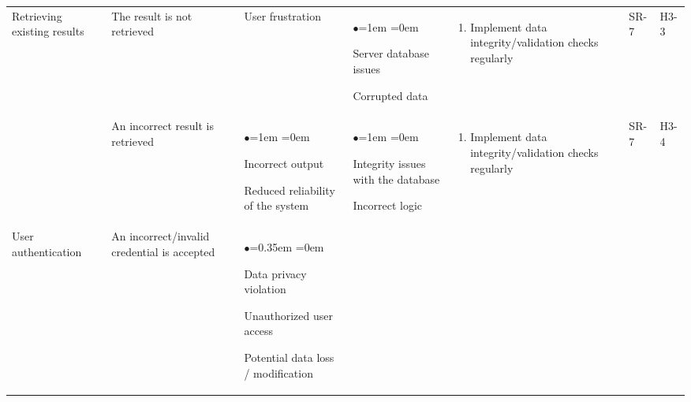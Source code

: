 \documentclass{article}
\begin{document}
\begin{table}[H]
    \centering
    \begin{tabularx}{\textwidth}{|P{2cm}|P{2cm}|P{2cm}|P{2cm}|P{3.45cm}|P{1cm}|P{1cm}|}
        \hline
        Retrieving existing results & The result is not retrieved & User frustration & 
        \begin{list}{$\bullet$}{\leftmargin=1em \itemindent=0em}
            \item Server database issues
            \item Corrupted data
        \end{list}
        & 
        \begin{enumerate}[label=(\alph*)]{\leftmargin=1em \itemindent=0em}
            \item Implement data integrity/validation checks regularly
        \end{enumerate}
        & SR-7 & H3-3\\
        & An incorrect result is retrieved & 
         \begin{list}{$\bullet$}{\leftmargin=1em \itemindent=0em}
            \item Incorrect output
            \item Reduced reliability of the system
        \end{list}
        & 
        \begin{list}{$\bullet$}{\leftmargin=1em \itemindent=0em}
            \item Integrity issues with the database
            \item Incorrect logic
        \end{list}
        & 
        \begin{enumerate}[label=(\alph*)]{\leftmargin=1em \itemindent=0em}
            \item Implement data integrity/validation checks regularly
        \end{enumerate}
        & SR-7 & H3-4\\
        \hline
        User authentication & An incorrect/invalid credential is accepted & 
        \begin{list}{$\bullet$}{\leftmargin=0.35em \itemindent=0em}
            \item Data privacy violation
            \item Unauthorized user access
            \item Potential data loss / modification
        \end{list}

\end{tabularx}
\end{table}
\end{document}
